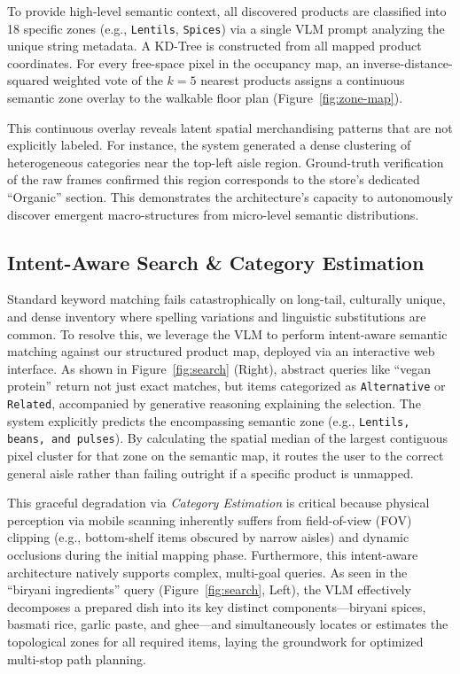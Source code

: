 \documentclass[sigconf,anonymous,review]{acmart}
\begin{document}
To provide high-level semantic context, all discovered products are classified into 18 specific zones (e.g., \texttt{Lentils}, \texttt{Spices}) via a single VLM prompt analyzing the unique string metadata. A KD-Tree is constructed from all mapped product coordinates. For every free-space pixel in the occupancy map, an inverse-distance-squared weighted vote of the $k=5$ nearest products assigns a continuous semantic zone overlay to the walkable floor plan (Figure~\ref{fig:zone-map}). 

This continuous overlay reveals latent spatial merchandising patterns that are not explicitly labeled. For instance, the system generated a dense clustering of heterogeneous categories near the top-left aisle region. Ground-truth verification of the raw frames confirmed this region corresponds to the store's dedicated ``Organic'' section. This demonstrates the architecture's capacity to autonomously discover emergent macro-structures from micro-level semantic distributions.

\subsection{Intent-Aware Search \& Category Estimation}
Standard keyword matching fails catastrophically on long-tail, culturally unique, and dense inventory where spelling variations and linguistic substitutions are common. To resolve this, we leverage the VLM to perform intent-aware semantic matching against our structured product map, deployed via an interactive web interface. As shown in Figure~\ref{fig:search} (Right), abstract queries like ``vegan protein'' return not just exact matches, but items categorized as \texttt{Alternative} or \texttt{Related}, accompanied by generative reasoning explaining the selection. The system explicitly predicts the encompassing semantic zone (e.g., \texttt{Lentils, beans, and pulses}). By calculating the spatial median of the largest contiguous pixel cluster for that zone on the semantic map, it routes the user to the correct general aisle rather than failing outright if a specific product is unmapped.

This graceful degradation via \emph{Category Estimation} is critical because physical perception via mobile scanning inherently suffers from field-of-view (FOV) clipping (e.g., bottom-shelf items obscured by narrow aisles) and dynamic occlusions during the initial mapping phase. Furthermore, this intent-aware architecture natively supports complex, multi-goal queries. As seen in the ``biryani ingredients'' query (Figure~\ref{fig:search}, Left), the VLM effectively decomposes a prepared dish into its key distinct components---biryani spices, basmati rice, garlic paste, and ghee---and simultaneously locates or estimates the topological zones for all required items, laying the groundwork for optimized multi-stop path planning.
\end{document}
